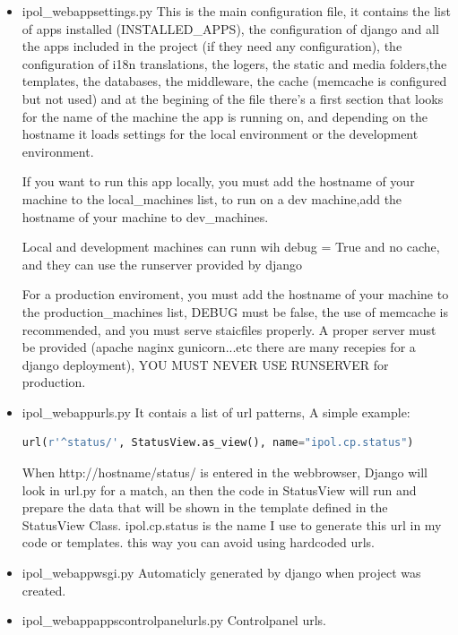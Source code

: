 \begin{itemize}
\item  ipol\_webapp\/settings.py
This is the main configuration file, it contains the list of apps installed (INSTALLED\_APPS), the configuration of django and all the apps included in the project (if they need any configuration), the configuration of i18n translations, the logers, the static and media folders,the templates, the databases, the middleware, the cache (memcache is configured but not used) and at the begining of the file there's a first section that looks for the name of the machine the app is running on, and depending on the hostname it loads settings for the local environment or the development environment.

If you want to run this app locally, you must add the hostname of your machine to the local\_machines list, 
to run on a dev machine,add the hostname of your machine to dev\_machines.

Local and development machines can runn wih debug = True and no cache, and they can use the runserver provided by django

For a production enviroment, you must add the hostname of your machine to the production\_machines list,  DEBUG must be false, the use of memcache is recommended, and you must serve staicfiles properly. A proper server must be provided (apache naginx gunicorn...etc there are many recepies for a django deployment), YOU MUST NEVER USE RUNSERVER for production.
 

\item  ipol\_webapp\/urls.py
It contais a list of url patterns, 
A simple example:
\begin{lstlisting}[language=Python,firstnumber=1]
url(r'^status/', StatusView.as_view(), name="ipol.cp.status")
\end{lstlisting}
When http://hostname/status/ is entered in the webbrowser, Django will look in url.py for a match, an then the code in StatusView will run and prepare the data that will be shown in the template defined in the StatusView Class.
ipol.cp.status is the name I use to generate this url in my code or templates. this way you can avoid using hardcoded urls.

\item  ipol\_webapp\/wsgi.py
Automaticly generated by django when project was created.

\item  ipol\_webapp\/apps\/controlpanel\/urls.py
Controlpanel urls.


\end{itemize}
